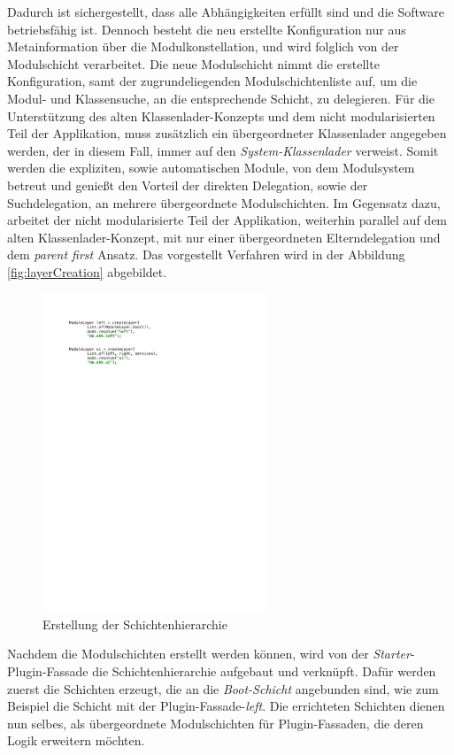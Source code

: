 	Dadurch ist sichergestellt, dass alle Abhängigkeiten erfüllt sind und die Software betriebsfähig ist. Dennoch besteht die neu erstellte Konfiguration nur aus Metainformation über die Modulkonstellation, und wird folglich von der Modulschicht verarbeitet. Die neue Modulschicht nimmt die erstellte Konfiguration, samt der zugrundeliegenden Modulschichtenliste auf, um die Modul- und Klassensuche, an die entsprechende Schicht, zu delegieren. Für die Unterstützung des alten Klassenlader-Konzepts und dem nicht modularisierten Teil der Applikation, muss zusätzlich ein übergeordneter Klassenlader angegeben werden, der in diesem Fall, immer auf den \textit{System-Klassenlader} verweist. Somit werden die expliziten, sowie automatischen Module, von dem Modulsystem betreut und genießt den Vorteil der direkten Delegation, sowie der Suchdelegation, an mehrere übergeordnete Modulschichten. Im Gegensatz dazu, arbeitet der nicht modularisierte Teil der Applikation, weiterhin parallel auf dem alten Klassenlader-Konzept, mit nur einer übergeordneten Elterndelegation und dem \textit{parent first} Ansatz. Das vorgestellt Verfahren wird in der Abbildung \ref{fig:layerCreation} abgebildet.\bigbreak
	\begin{figure}[h!]
		   \centering
		   \captionsetup{justification=centering}
		   \includegraphics[width=0.6\textwidth]{material/images/umsetzung/left.pdf}
		   \caption{Erstellung der Schichtenhierarchie}
		   \label{fig:createlayer}
	\end{figure}
	Nachdem die Modulschichten erstellt werden können, wird von der \textit{Starter}-Plugin-Fassade die Schichtenhierarchie aufgebaut und verknüpft. Dafür werden zuerst die Schichten erzeugt, die an die \textit{Boot-Schicht} angebunden sind, wie zum Beispiel die Schicht mit der Plugin-Fassade-\textit{left}. Die errichteten Schichten dienen nun selbes, als übergeordnete Modulschichten für Plugin-Fassaden, die deren Logik erweitern möchten. \newline
